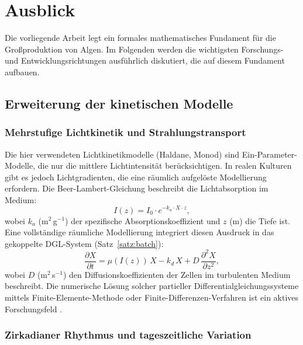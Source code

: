 ﻿\documentclass[a4paper,12pt]{article}
\theoremstyle{definition}
\begin{document}
\section{Ausblick}

Die vorliegende Arbeit legt ein formales mathematisches Fundament für die
Großproduktion von Algen. Im Folgenden werden die wichtigsten Forschungs- und
Entwicklungsrichtungen ausführlich diskutiert, die auf diesem Fundament aufbauen.

\subsection{Erweiterung der kinetischen Modelle}

\subsubsection{Mehrstufige Lichtkinetik und Strahlungstransport}

Die hier verwendeten Lichtkinetikmodelle (Haldane, Monod) sind Ein-Parameter-Modelle,
die nur die mittlere Lichtintensität berücksichtigen. In realen Kulturen gibt es
jedoch Lichtgradienten, die eine räumlich aufgelöste Modellierung erfordern.
Die Beer-Lambert-Gleichung beschreibt die Lichtabsorption im Medium:
\[
	I(z) = I_0 \cdot e^{-k_a \cdot X \cdot z},
\]
wobei $k_a$ (m$^2$\,g$^{-1}$) der spezifische Absorptionskoeffizient und $z$ (m)
die Tiefe ist. Eine vollständige räumliche Modellierung integriert diesen
Ausdruck in das gekoppelte DGL-System (Satz~\ref{satz:batch}):
\[
	\frac{\partial X}{\partial t} = \mu(I(z))\,X - k_d\,X + D\,\frac{\partial^2 X}{\partial z^2},
\]
wobei $D$ (m$^2$\,s$^{-1}$) den Diffusionskoeffizienten der Zellen im
turbulenten Medium beschreibt. Die numerische Lösung solcher partieller
Differentialgleichungssysteme mittels Finite-Elemente-Methode oder
Finite-Differenzen-Verfahren ist ein aktives Forschungsfeld
\cite{richmond2004,cornet1998}.

\subsubsection{Zirkadianer Rhythmus und tageszeitliche Variation}
\end{document}
